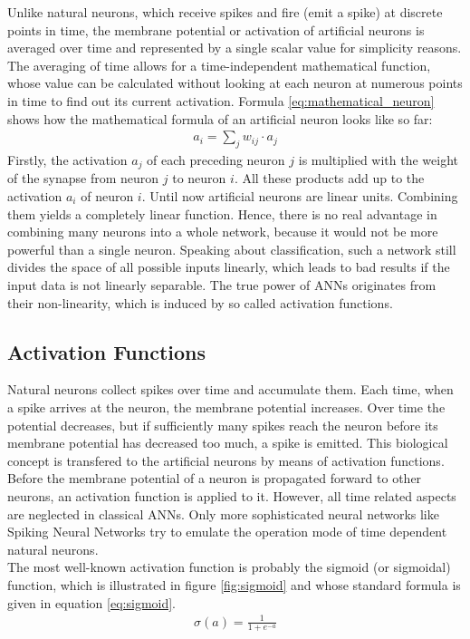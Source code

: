 \documentclass[11pt, a4paper]{article}
\begin{document}
 Unlike natural neurons, which receive spikes and fire (emit a spike) at discrete points in time, the membrane potential or activation of artificial neurons is averaged over time and represented by a single scalar value for simplicity reasons. The averaging of time allows for a time-independent mathematical function, whose value can be calculated without looking at each neuron at numerous points in time to find out its current activation. Formula \eqref{eq:mathematical_neuron} shows how the mathematical formula of an artificial neuron looks like so far:
\begin{align}
\label{eq:mathematical_neuron}
a_i = \sum_j w_{ij} \cdot a_j
\end{align}
Firstly, the activation $a_j$ of each preceding neuron $j$ is multiplied with the weight of the synapse from neuron $j$ to neuron $i$. All these products add up to the activation $a_i$ of neuron $i$. Until now artificial neurons are linear units. Combining them yields a completely linear function. Hence, there is no real advantage in combining many neurons into a whole network, because it would not be more powerful than a single neuron. Speaking about classification, such a network still divides the space of all possible inputs linearly, which leads to bad results if the input data is not linearly separable. The true power of \acp{ANN} originates from their non-linearity, which is induced by so called activation functions.

\subsection{Activation Functions}

Natural neurons collect spikes over time and accumulate them. Each time, when a spike arrives at the neuron, the membrane potential increases. Over time the potential decreases, but if sufficiently many spikes reach the neuron before its membrane potential has decreased too much, a spike is emitted. This biological concept is transfered to the artificial neurons by means of activation functions. Before the membrane potential of a neuron is propagated forward to other neurons, an activation function is applied to it. However, all time related aspects are neglected in classical \acp{ANN}. Only more sophisticated neural networks like Spiking Neural Networks try to emulate the operation mode of time dependent natural neurons.\\
The most well-known activation function is probably the sigmoid (or sigmoidal) function, which is illustrated in figure \ref{fig:sigmoid} and whose standard formula is given in equation \eqref{eq:sigmoid}.
\begin{align}
\label{eq:sigmoid}
\sigma(a) = \frac{1}{1 + e^{-a}}
\end{align}
\end{document}
